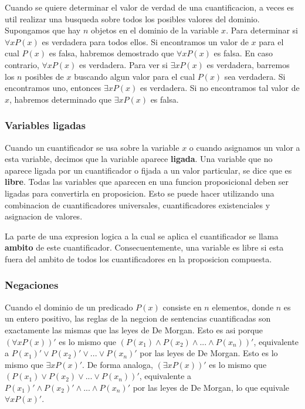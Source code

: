 \documentclass[]{article}
\begin{document}
Cuando se quiere determinar el valor de verdad de una cuantificacion, a veces es util realizar una busqueda sobre todos los posibles valores del dominio. Supongamos que hay $n$ objetos en el dominio de la variable $x$. Para determinar si $\forall xP(x)$ es verdadera para todos ellos. Si encontramos un valor de $x$ para el cual $P(x)$ es falsa, habremos demostrado que $\forall xP(x)$ es falsa. En caso contrario, $\forall xP(x)$ es verdadera. Para ver si $\exists x P(x)$ es verdadera, barremos los $n$ posibles de $x$ buscando algun valor para el cual $P(x)$ sea verdadera. Si encontramos uno, entonces $\exists x P(x)$ es verdadera. Si no encontramos tal valor de $x$, habremos determinado que $\exists x P(x)$ es falsa.

\subsubsection*{Variables ligadas}

Cuando un cuantificador se usa sobre la variable $x$ o cuando asignamos un valor a esta variable, decimos que la variable aparece \textbf{ligada}. Una variable que no aparece ligada por un cuantificador o fijada a un valor particular, se dice que es \textbf{libre}. Todas las variables que aparecen en una funcion proposicional deben ser ligadas para convertirla en proposicion. Esto se puede hacer utilizando una combinacion de cuantificadores universales, cuantificadores existenciales y asignacion de valores.

La parte de una expresion logica a la cual se aplica el cuantificador se llama \textbf{ambito} de este cuantificador. Consecuentemente, una variable es libre si esta fuera del ambito de todos los cuantificadores en la proposicion compuesta.

\subsubsection*{Negaciones}

Cuando el dominio de un predicado $P(x)$ consiste en $n$ elementos, donde $n$ es un entero positivo, las reglas de la negcion de sentencias cuantificadas son exactamente las mismas que las leyes de De Morgan. Esto es asi porque $(\forall x P(x))'$ es lo mismo que $(P(x_{1}) \wedge P(x_{2}) \wedge ... \wedge P(x_{n}))'$, equivalente a $P(x_{1})' \vee P(x_{2})' \vee ... \vee P(x_{n})'$ por las leyes de De Morgan. Esto es lo mismo que $\exists x P(x)'$. De forma analoga,  $(\exists x P(x))'$ es lo mismo que $(P(x_{1}) \vee P(x_{2}) \vee ... \vee P(x_{n}))'$, equivalente a $P(x_{1})' \wedge P(x_{2})' \wedge ... \wedge P(x_{n})'$ por las leyes de De Morgan, lo que equivale  $\forall x P(x)'$.
\end{document}

